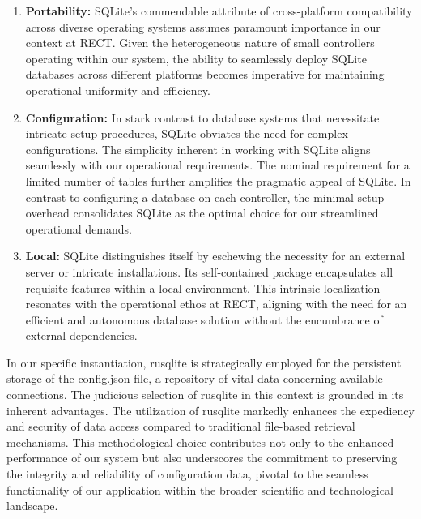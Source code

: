 \begin{enumerate}
    \item \textbf{Portability:} SQLite's commendable attribute of cross-platform compatibility across diverse operating systems assumes paramount importance in 
    our context at RECT. Given the heterogeneous nature of small controllers operating within our system, the ability to seamlessly deploy SQLite databases 
    across different platforms becomes imperative for maintaining operational uniformity and efficiency.
    
    \item \textbf{Configuration:} In stark contrast to database systems that necessitate intricate setup procedures, SQLite obviates the need for complex 
    configurations. The simplicity inherent in working with SQLite aligns seamlessly with our operational requirements. The nominal requirement for a limited 
    number of tables further amplifies the pragmatic appeal of SQLite. In contrast to configuring a database on each controller, the minimal setup overhead 
    consolidates SQLite as the optimal choice for our streamlined operational demands.
    
    \item \textbf{Local:} SQLite distinguishes itself by eschewing the necessity for an external server or intricate installations. Its self-contained package 
    encapsulates all requisite features within a local environment. This intrinsic localization resonates with the operational ethos at RECT, aligning with the 
    need for an efficient and autonomous database solution without the encumbrance of external dependencies.
\end{enumerate}

In our specific instantiation, rusqlite is strategically employed for the persistent storage of the config.json file, a repository of vital data concerning 
available connections. The judicious selection of rusqlite in this context is grounded in its inherent advantages. The utilization of rusqlite markedly enhances 
the expediency and security of data access compared to traditional file-based retrieval mechanisms. This methodological choice contributes not only to the 
enhanced performance of our system but also underscores the commitment to preserving the integrity and reliability of configuration data, pivotal to the seamless
functionality of our application within the broader scientific and technological landscape.

